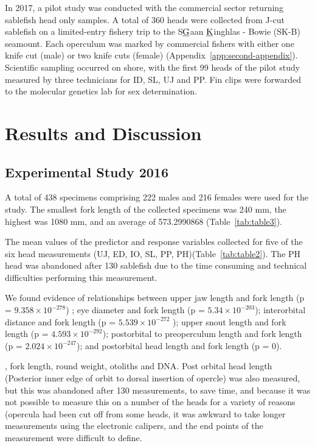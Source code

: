 \documentclass[12pt]{article}\usepackage[]{graphicx}\usepackage[]{color}
\begin{document}
In 2017, a pilot study was conducted with the commercial sector returning sablefish head only samples. A total of 360 heads were collected from J-cut sablefish on a limited-entry fishery trip to the S\(\text{\underline{G}}\)aan \(\text{\underline{K}}\)inghlas - Bowie (SK-B) seamount. Each operculum was marked by commercial fishers with either one knife cut (male) or two knife cuts (female) (Appendix~\ref{app:second-appendix}). Scientific sampling occurred on shore, with the first 99 heads of the pilot study measured by three technicians for ID, SL, UJ and PP. Fin clips were forwarded to the molecular genetics lab for sex determination.

\clearpage

\hypertarget{results-and-discussion}{%
\section{Results and Discussion}\label{results-and-discussion}}

\hypertarget{experimental-study-2016-1}{%
\subsection{Experimental Study 2016}\label{experimental-study-2016-1}}

A total of 438 specimens comprising 222 males and 216 females were used for the study. The smallest fork length of the collected specimens was 240 mm, the highest was 1080 mm, and an average of 573.2990868 (Table~\ref{tab:table3}).

The mean values of the predictor and response variables collected for five of the six head measurements (UJ, ED, IO, SL, PP, PH)(Table~\ref{tab:table2}). The PH head was abandoned after 130 sablefish due to the time consuming and technical difficulties performing this measurement.

We found evidence of relationships between upper jaw length and fork length (p = \ensuremath{9.358\times 10^{-278}}) ; eye diameter and fork length (p = \ensuremath{5.34\times 10^{-203}}); interorbital distance and fork length (p = \ensuremath{5.539\times 10^{-272}} ); upper snout length and fork length (p = \ensuremath{4.593\times 10^{-292}}); postorbital to preoperculum length and fork length (p = \ensuremath{2.024\times 10^{-247}}); and postorbital head length and fork length (p = 0).

, fork length, round weight, otoliths and DNA. Post orbital head length (Posterior inner edge of orbit to dorsal insertion of opercle) was also measured, but this was abandoned after 130 measurements, to save time, and because it was not possible to measure this on a number of the heads for a variety of reasons (opercula had been cut off from some heads, it was awkward to take longer measurements using the electronic calipers, and the end points of the measurement were difficult to define.
\end{document}
